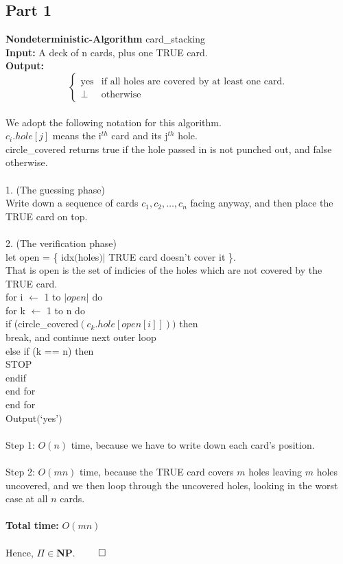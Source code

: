 \documentclass{article}
\begin{document}
    \subsection{Part 1}
      \textbf{Nondeterministic-Algorithm} card\_stacking\\
      \textbf{Input:} A deck of n cards, plus one TRUE card.\\
      \textbf{Output:} 
        \begin{equation*}
          \begin{cases}
            \text{yes} & \text{if all holes are covered by at least one card.}\\
            \perp    & \text{otherwise}
          \end{cases}
        \end{equation*}
      \\
      We adopt the following notation for this algorithm.\\
      $c_{i}.hole[j]$ means the i$^{th}$ card and its j$^{th}$ hole.\\
      circle\_covered returns true if the hole passed in is not punched out, and false otherwise.\\
      \\
      1. (The guessing phase)\\
      Write down a sequence of cards $c_{1}, c_{2}, \ldots, c_{n}$ facing anyway, and then place the TRUE card on top.\\
      \\
      2. (The verification phase)\\
      let open = \{ idx$($holes$) |$ TRUE card doesn't cover it \}.\\
      That is open is the set of indicies of the holes which are not covered by the TRUE card.\\
      for i $\leftarrow$ 1 to $|open|$ do\\
      \indent for k $\leftarrow$ 1 to n do\\
      \indent \indent if (circle\_covered$(c_{k}.hole[open[i]]))$ then \\
      \indent \indent \indent break, and continue next outer loop\\
      \indent \indent else if (k == n) then \\
      \indent \indent \indent STOP\\
      \indent \indent endif\\
      \indent end for\\
      end for\\
      Output$($`yes'$)$\\
      \\
      Step 1: $O(n)$ time, because we have to write down each card's position.\\
      \\
      Step 2: $O(mn)$ time, because the TRUE card covers $m$ holes leaving $m$ holes uncovered, and we then loop through the uncovered holes, looking in the worst case at all $n$ cards.\\
      \\
      \textbf{Total time:} $O(mn)$\\
      \\
      Hence, $\Pi \in $\textbf{NP}. $\qed$ \\
\end{document}
